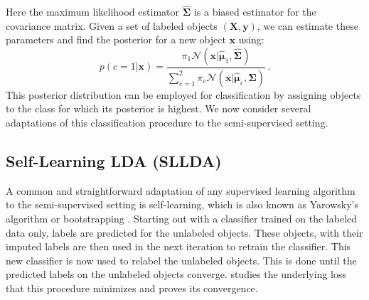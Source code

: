 \documentclass[twoside]{memoir}\usepackage[]{graphicx}\usepackage{xcolor}
\renewcommand{\cite}{\citep}
\begin{document}
Here the maximum likelihood estimator $\hat{\mathbf{\Sigma}}$ is a biased estimator for the covariance matrix. Given a set of labeled objects $(\mathbf{X},\mathbf{y})$, we can estimate these parameters and find the posterior for a new object $\mathbf{x}$ using:
\begin{equation}
p(c=1|\mathbf{x})=\frac{\pi_1 \mathcal{N}(\mathbf{x}|\hat{\boldsymbol{\mu}}_1,\hat{\mathbf{\Sigma}})}{\sum_{c=1}^{2} \pi_c \mathcal{N}(\mathbf{x}|\hat{\boldsymbol{\mu}}_c,\hat{\mathbf{\Sigma}})} \,.
\end{equation}
This posterior distribution can be employed for classification by assigning objects to the class for which its posterior is highest. We now consider several adaptations of this classification procedure to the  semi-supervised setting.

\subsection{Self-Learning LDA (SLLDA)}
A common and straightforward adaptation of any supervised learning algorithm to the semi-supervised setting is self-learning, which is also known as Yarowsky's algorithm or bootstrapping \cite{McLachlan1975,Yarowsky1995}. Starting out with a classifier trained on the labeled data only, labels are  predicted for the unlabeled objects. These objects, with their imputed labels are then used in the next iteration to retrain the classifier. This new classifier is now used to relabel the unlabeled objects. This is done until the predicted labels on the unlabeled objects converge. \citet{Abney2004} studies the underlying loss that this procedure minimizes and proves its convergence.
\end{document}
